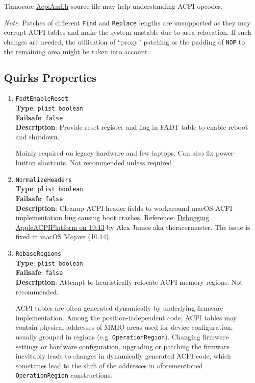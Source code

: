 \documentclass[]{article}
\begin{document}
Tianocore \href{https://github.com/acidanthera/audk/blob/master/MdePkg/Include/IndustryStandard/AcpiAml.h}{AcpiAml.h}
source file may help understanding ACPI opcodes.

\emph{Note}: Patches of different \texttt{Find} and \texttt{Replace} lengths
are unsupported as they may corrupt ACPI tables and make the system unstable
due to area relocation. If such changes are needed, the utilisation of ``proxy''
patching or the padding of \texttt{NOP} to the remaining area might be taken into account.

\subsection{Quirks Properties}\label{acpipropsquirks}

\begin{enumerate}

\item
  \texttt{FadtEnableReset}\\
  \textbf{Type}: \texttt{plist\ boolean}\\
  \textbf{Failsafe}: \texttt{false}\\
  \textbf{Description}: Provide reset register and flag in FADT table to enable
  reboot and shutdown.

  Mainly required on legacy hardware and few laptops. Can also fix power-button
  shortcuts. Not recommended unless required.

\item
  \texttt{NormalizeHeaders}\\
  \textbf{Type}: \texttt{plist\ boolean}\\
  \textbf{Failsafe}: \texttt{false}\\
  \textbf{Description}: Cleanup ACPI header fields to workaround macOS
  ACPI implementation bug causing boot crashes. Reference:
  \href{https://alextjam.es/debugging-appleacpiplatform/}{Debugging
  AppleACPIPlatform on 10.13} by Alex James aka theracermaster. The
  issue is fixed in macOS Mojave (10.14).

\item
  \texttt{RebaseRegions}\\
  \textbf{Type}: \texttt{plist\ boolean}\\
  \textbf{Failsafe}: \texttt{false}\\
  \textbf{Description}: Attempt to heuristically relocate ACPI memory
  regions. Not recommended.

  ACPI tables are often generated dynamically by underlying firmware
  implementation. Among the position-independent code, ACPI tables may
  contain physical addresses of MMIO areas used for device
  configuration, usually grouped in regions (e.g.
  \texttt{OperationRegion}). Changing firmware settings or hardware
  configuration, upgrading or patching the firmware inevitably leads to
  changes in dynamically generated ACPI code, which sometimes lead to
  the shift of the addresses in aforementioned \texttt{OperationRegion}
  constructions.


\end{enumerate}
\end{document}
